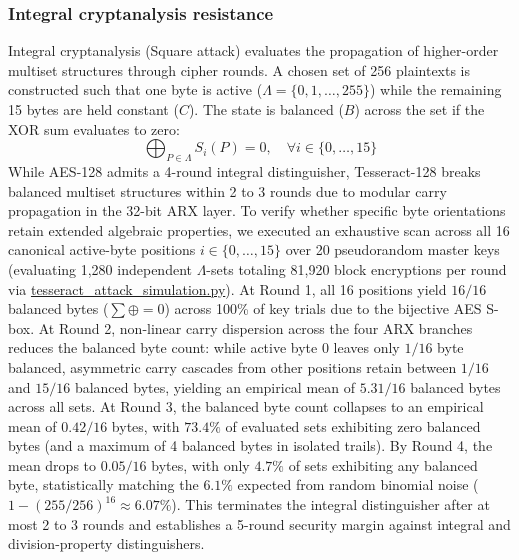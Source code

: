 \documentclass[review,12pt]{elsarticle}
\begin{document}
\subsubsection{Integral cryptanalysis resistance}
Integral cryptanalysis (Square attack) evaluates the propagation of higher-order multiset structures through cipher rounds. A chosen set of 256 plaintexts is constructed such that one byte is active ($\Lambda = \{0, 1, \dots, 255\}$) while the remaining 15 bytes are held constant ($C$). The state is balanced ($B$) across the set if the XOR sum evaluates to zero:
\begin{equation}
    \bigoplus_{P \in \Lambda} S_i(P) = 0, \quad \forall i \in \{0, \dots, 15\}
\end{equation}
While AES-128 admits a 4-round integral distinguisher, Tesseract-128 breaks balanced multiset structures within 2 to 3 rounds due to modular carry propagation in the 32-bit ARX layer. To verify whether specific byte orientations retain extended algebraic properties, we executed an exhaustive scan across all 16 canonical active-byte positions $i \in \{0, \dots, 15\}$ over 20 pseudorandom master keys (evaluating 1,280 independent $\Lambda$-sets totaling 81,920 block encryptions per round via \url{tesseract_attack_simulation.py}). At Round 1, all 16 positions yield $16/16$ balanced bytes ($\sum \oplus = 0$) across 100\% of key trials due to the bijective AES S-box. At Round 2, non-linear carry dispersion across the four ARX branches reduces the balanced byte count: while active byte 0 leaves only $1/16$ byte balanced, asymmetric carry cascades from other positions retain between $1/16$ and $15/16$ balanced bytes, yielding an empirical mean of $5.31/16$ balanced bytes across all sets. At Round 3, the balanced byte count collapses to an empirical mean of $0.42/16$ bytes, with $73.4\%$ of evaluated sets exhibiting zero balanced bytes (and a maximum of 4 balanced bytes in isolated trails). By Round 4, the mean drops to $0.05/16$ bytes, with only $4.7\%$ of sets exhibiting any balanced byte, statistically matching the $6.1\%$ expected from random binomial noise ($1 - (255/256)^{16} \approx 6.07\%$). This terminates the integral distinguisher after at most 2 to 3 rounds and establishes a 5-round security margin against integral and division-property distinguishers.
\end{document}
